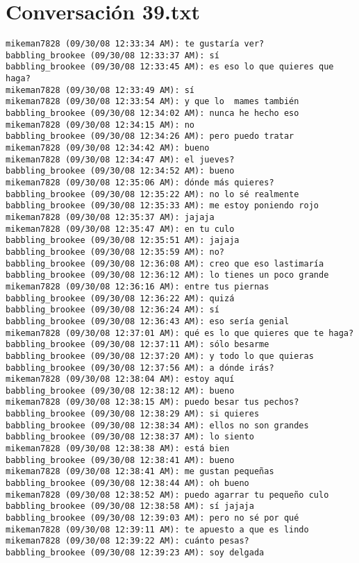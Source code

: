 \section{Conversaci\'on 39.txt}

\begin{verbatim}
mikeman7828 (09/30/08 12:33:34 AM): te gustaría ver?
babbling_brookee (09/30/08 12:33:37 AM): sí
babbling_brookee (09/30/08 12:33:45 AM): es eso lo que quieres que haga?
mikeman7828 (09/30/08 12:33:49 AM): sí
mikeman7828 (09/30/08 12:33:54 AM): y que lo  mames también
babbling_brookee (09/30/08 12:34:02 AM): nunca he hecho eso
mikeman7828 (09/30/08 12:34:15 AM): no
babbling_brookee (09/30/08 12:34:26 AM): pero puedo tratar
mikeman7828 (09/30/08 12:34:42 AM): bueno
mikeman7828 (09/30/08 12:34:47 AM): el jueves?
babbling_brookee (09/30/08 12:34:52 AM): bueno
mikeman7828 (09/30/08 12:35:06 AM): dónde más quieres?
babbling_brookee (09/30/08 12:35:22 AM): no lo sé realmente
babbling_brookee (09/30/08 12:35:33 AM): me estoy poniendo rojo
mikeman7828 (09/30/08 12:35:37 AM): jajaja
mikeman7828 (09/30/08 12:35:47 AM): en tu culo
babbling_brookee (09/30/08 12:35:51 AM): jajaja
babbling_brookee (09/30/08 12:35:59 AM): no?
babbling_brookee (09/30/08 12:36:08 AM): creo que eso lastimaría
babbling_brookee (09/30/08 12:36:12 AM): lo tienes un poco grande
mikeman7828 (09/30/08 12:36:16 AM): entre tus piernas
babbling_brookee (09/30/08 12:36:22 AM): quizá
babbling_brookee (09/30/08 12:36:24 AM): sí
babbling_brookee (09/30/08 12:36:43 AM): eso sería genial
mikeman7828 (09/30/08 12:37:01 AM): qué es lo que quieres que te haga?
babbling_brookee (09/30/08 12:37:11 AM): sólo besarme
babbling_brookee (09/30/08 12:37:20 AM): y todo lo que quieras
babbling_brookee (09/30/08 12:37:56 AM): a dónde irás?
mikeman7828 (09/30/08 12:38:04 AM): estoy aquí
babbling_brookee (09/30/08 12:38:12 AM): bueno
mikeman7828 (09/30/08 12:38:15 AM): puedo besar tus pechos?
babbling_brookee (09/30/08 12:38:29 AM): si quieres
babbling_brookee (09/30/08 12:38:34 AM): ellos no son grandes
babbling_brookee (09/30/08 12:38:37 AM): lo siento
mikeman7828 (09/30/08 12:38:38 AM): está bien
babbling_brookee (09/30/08 12:38:41 AM): bueno
mikeman7828 (09/30/08 12:38:41 AM): me gustan pequeñas
babbling_brookee (09/30/08 12:38:44 AM): oh bueno
mikeman7828 (09/30/08 12:38:52 AM): puedo agarrar tu pequeño culo
babbling_brookee (09/30/08 12:38:58 AM): sí jajaja
babbling_brookee (09/30/08 12:39:03 AM): pero no sé por qué
mikeman7828 (09/30/08 12:39:11 AM): te apuesto a que es lindo
mikeman7828 (09/30/08 12:39:22 AM): cuánto pesas?
babbling_brookee (09/30/08 12:39:23 AM): soy delgada

\end{verbatim}
